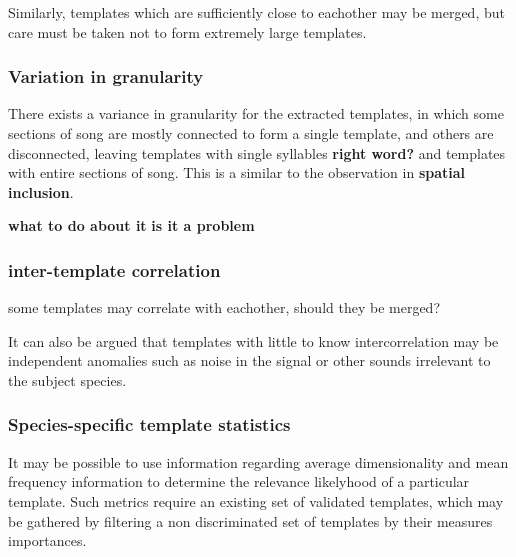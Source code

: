 Similarly, templates which are sufficiently close to eachother may be merged,
but care must be taken not to form extremely large templates.

\subsubsection{Variation in granularity}
There exists a variance in granularity for the extracted templates, in which
some sections of song are mostly connected to form a single template, and others
are disconnected, leaving templates with single syllables \textbf{right word?}
and templates with entire sections of song.
This is a similar to the observation in \textbf{spatial inclusion}.

\textbf{what to do about it}
\textbf{is it a problem}


\subsubsection{inter-template correlation}
some templates may correlate with eachother, should they be merged?

It can also be argued that templates with little to know intercorrelation may be
independent anomalies such as noise in the signal or other sounds irrelevant to
the subject species.

\subsubsection{Species-specific template statistics}
It may be possible to use information regarding average dimensionality and mean
frequency information to determine the relevance likelyhood of a particular template.
Such metrics require an existing set of validated templates, which may be gathered
by filtering a non discriminated set of templates by their measures importances.
